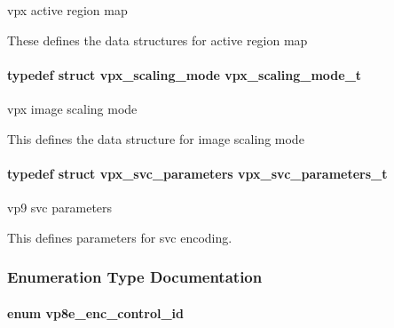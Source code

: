 vpx active region map 

\-These defines the data structures for active region map \hypertarget{group__vp8__encoder_ga9600359ed9096cd96c621d9cf6c8df38}{
\paragraph[{vpx\-\_\-scaling\-\_\-mode\-\_\-t}]{\setlength{\rightskip}{0pt plus 5cm}typedef struct {\bf vpx\-\_\-scaling\-\_\-mode}  {\bf vpx\-\_\-scaling\-\_\-mode\-\_\-t}}}\label{group__vp8__encoder_ga9600359ed9096cd96c621d9cf6c8df38}


vpx image scaling mode 

\-This defines the data structure for image scaling mode \hypertarget{group__vp8__encoder_gaf01e78e24ae1cb54e8a455d74f3c31c8}{
\paragraph[{vpx\-\_\-svc\-\_\-parameters\-\_\-t}]{\setlength{\rightskip}{0pt plus 5cm}typedef struct {\bf vpx\-\_\-svc\-\_\-parameters}  {\bf vpx\-\_\-svc\-\_\-parameters\-\_\-t}}}\label{group__vp8__encoder_gaf01e78e24ae1cb54e8a455d74f3c31c8}


vp9 svc parameters 

\-This defines parameters for svc encoding. 

\subsubsection{\-Enumeration \-Type \-Documentation}
\hypertarget{group__vp8__encoder_ga6deae3d561c838952552c3d3756322ec}{
\paragraph[{vp8e\-\_\-enc\-\_\-control\-\_\-id}]{\setlength{\rightskip}{0pt plus 5cm}enum {\bf vp8e\-\_\-enc\-\_\-control\-\_\-id}}}\label{group__vp8__encoder_ga6deae3d561c838952552c3d3756322ec}


